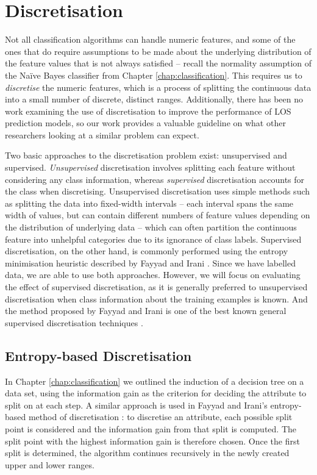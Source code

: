 \section{Discretisation}
Not all classification algorithms can handle numeric features, and some of the
ones that do require assumptions to be made about the underlying distribution
of the feature values that is not always satisfied -- recall the normality
assumption of the Na\"{i}ve Bayes classifier
from Chapter \ref{chap:classification}. This requires us
to \textit{discretise} the numeric features, which is a process of splitting
the continuous data into a small number of discrete, distinct ranges.
Additionally, there has been no work examining the use of discretisation to
improve the performance of LOS prediction models, so our work provides a
valuable guideline on what other researchers looking at a similar problem can
expect.

Two basic approaches to the discretisation problem exist: unsupervised and
supervised. \textit{Unsupervised} discretisation involves splitting each
feature without considering any class information, whereas \textit{supervised}
discretisation accounts for the class when discretising.
Unsupervised discretisation uses simple methods such as splitting the data into
fixed-width intervals -- each interval spans the same width of values,
but can contain different numbers of feature values depending on the
distribution of underlying data -- which
can often partition the continuous feature into unhelpful categories due to its
ignorance of class labels. Supervised discretisation, on the
other hand, is commonly performed using the entropy minimisation heuristic
described by Fayyad and Irani \cite{Fayyad1993}. Since we have labelled
data, we are able to use both approaches. However, we will focus on evaluating
the effect of supervised discretisation, as it is generally preferred to
unsupervised discretisation when class information about the training examples
is known. And the method proposed by Fayyad and Irani is one of the best known
general supervised discretisation techniques \cite{Witten2005}.

\subsection{Entropy-based Discretisation}
In Chapter \ref{chap:classification} we outlined the induction of a decision
tree on a data set, using the information gain as the criterion for deciding
the attribute to split on at each step. A similar approach is used in Fayyad
and Irani's entropy-based method of discretisation \cite{Fayyad1993}:
to discretise an attribute,
each possible split point is considered and the information gain from that
split is computed. The split point with the highest information gain is
therefore chosen. Once the first split is determined, the algorithm continues
recursively in the newly created upper and lower ranges.

